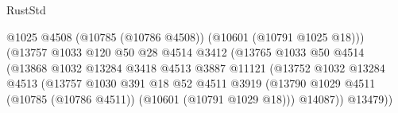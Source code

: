 \begin{lexlean}{RustStd}
\begin{coremodule}
                                                      @1025
                                                      @4508
                                                      (@10785 (@10786 @4508))
                                                      (@10601 (@10791 @1025 @18)))
                                                    (@13757
                                                      @1033
                                                      @120
                                                      @50
                                                      @28
                                                      @4514
                                                      @3412
                                                      (@13765
                                                        @1033
                                                        @50
                                                        @4514
                                                        (@13868
                                                          @1032
                                                          @13284
                                                          @3418
                                                          @4513
                                                          @3887
                                                          @11121
                                                          (@13752
                                                            @1032
                                                            @13284
                                                            @4513
                                                            (@13757
                                                              @1030
                                                              @391
                                                              @18
                                                              @52
                                                              @4511
                                                              @3919
                                                              (@13790
                                                                @1029
                                                                @4511
                                                                (@10785 (@10786 @4511))
                                                                (@10601 (@10791 @1029 @18)))
                                                              @14087))
                                                          @13479))

\end{coremodule}
\end{lexlean}
